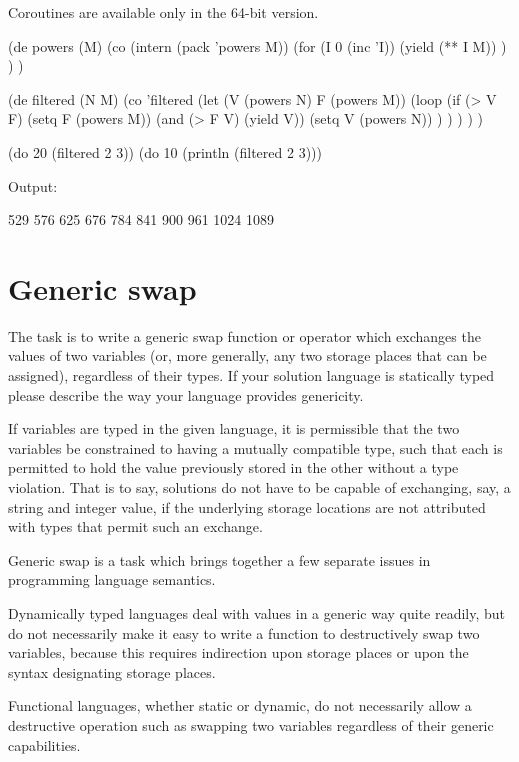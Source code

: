 \begin{wideverbatim}

Coroutines are available only in the 64-bit version.

(de powers (M)
   (co (intern (pack 'powers M))
      (for (I 0 (inc 'I))
         (yield (** I M)) ) ) )

(de filtered (N M)
   (co 'filtered
      (let (V (powers N)  F (powers M))
         (loop
            (if (> V F)
               (setq F (powers M))
               (and (> F V) (yield V))
               (setq V (powers N)) ) ) ) ) )

(do 20 (filtered 2 3))
(do 10 (println (filtered 2 3)))

Output:

529
576
625
676
784
841
900
961
1024
1089

\end{wideverbatim}

\pagebreak{}
\section*{Generic swap}

The task is to write a generic swap function or operator which exchanges
the values of two variables (or, more generally, any two storage places
that can be assigned), regardless of their types. If your solution
language is statically typed please describe the way your language
provides genericity.

If variables are typed in the given language, it is permissible that the
two variables be constrained to having a mutually compatible type, such
that each is permitted to hold the value previously stored in the other
without a type violation. That is to say, solutions do not have to be
capable of exchanging, say, a string and integer value, if the
underlying storage locations are not attributed with types that permit
such an exchange.

Generic swap is a task which brings together a few separate issues in
programming language semantics.

Dynamically typed languages deal with values in a generic way quite
readily, but do not necessarily make it easy to write a function to
destructively swap two variables, because this requires indirection upon
storage places or upon the syntax designating storage places.

Functional languages, whether static or dynamic, do not necessarily
allow a destructive operation such as swapping two variables regardless
of their generic capabilities.


